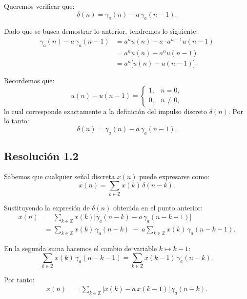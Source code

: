 \documentclass[
  11pt,
  letterpaper,
   addpoints,
   answers
  ]{exam}
\begin{document}
\begin{questions}
\begin{solution}
Queremos verificar que:
\begin{equation}
\delta(n) = \gamma_a(n) - a\,\gamma_a(n-1).
\end{equation}

Dado que se busca demostrar lo anterior, tendremos lo siguiente:
\begin{align}
\gamma_a(n) - a\,\gamma_a(n-1) &= a^n u(n) - a\cdot a^{n-1}u(n-1) \\
&= a^n u(n) - a^n u(n-1) \\
&= a^n\big[u(n) - u(n-1)\big].
\end{align}

Recordemos que:
\begin{equation}
u(n) - u(n-1) =
\begin{cases}
1, & n=0, \\
0, & n\neq 0,
\end{cases}
\end{equation}
lo cual corresponde exactamente a la definición del impulso discreto \(\delta(n)\). Por lo tanto:
\begin{equation}
\delta(n) = \gamma_a(n) - a\,\gamma_a(n-1).
\end{equation}

\subsection*{Resolución 1.2}
Sabemos que cualquier señal discreta \(x(n)\) puede expresarse como:
\begin{equation}
x(n) = \sum_{k \in \mathbb{Z}} x(k)\,\delta(n-k).
\end{equation}

Sustituyendo la expresión de \(\delta(n)\) obtenida en el punto anterior:
\begin{align}
x(n) &= \sum_{k \in \mathbb{Z}} x(k)\Big[ \gamma_a(n-k) - a\,\gamma_a(n-k-1)\Big] \\
&= \sum_{k \in \mathbb{Z}} x(k)\,\gamma_a(n-k) \;-\; a \sum_{k \in \mathbb{Z}} x(k)\,\gamma_a(n-k-1).
\end{align}

En la segunda suma hacemos el cambio de variable \(k \mapsto k-1\):
\begin{equation}
\sum_{k \in \mathbb{Z}} x(k)\,\gamma_a(n-k-1) 
= \sum_{k \in \mathbb{Z}} x(k-1)\,\gamma_a(n-k).
\end{equation}

Por tanto:
\begin{align}
x(n) &= \sum_{k \in \mathbb{Z}} \Big[x(k) - a\,x(k-1)\Big] \,\gamma_a(n-k).
\end{align}


\end{solution}
\end{questions}
\end{document}
